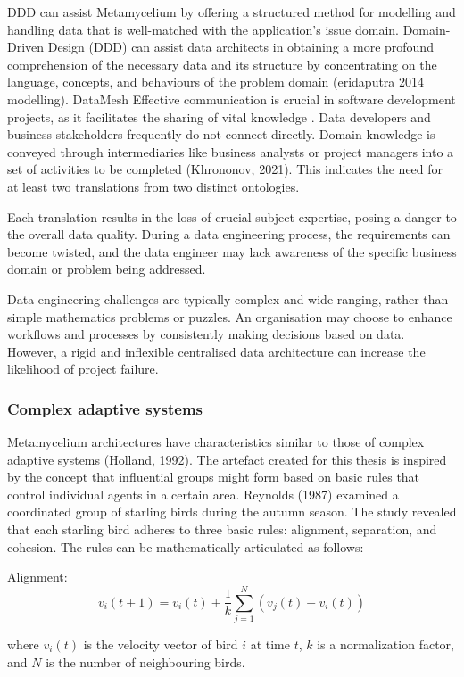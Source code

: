 \documentclass[journal]{IEEEtran}
\begin{document}
DDD can assist Metamycelium by offering a structured method for modelling and handling data that is well-matched with the application's issue domain. Domain-Driven Design (DDD) can assist data architects in obtaining a more profound comprehension of the necessary data and its structure by concentrating on the language, concepts, and behaviours of the problem domain (eridaputra 2014 modelling). DataMesh Effective communication is crucial in software development projects, as it facilitates the sharing of vital knowledge \cite{sudhakar2012model}. Data developers and business stakeholders frequently do not connect directly. Domain knowledge is conveyed through intermediaries like business analysts or project managers into a set of activities to be completed (Khrononov, 2021). This indicates the need for at least two translations from two distinct ontologies.

Each translation results in the loss of crucial subject expertise, posing a danger to the overall data quality. During a data engineering process, the requirements can become twisted, and the data engineer may lack awareness of the specific business domain or problem being addressed.

Data engineering challenges are typically complex and wide-ranging, rather than simple mathematics problems or puzzles. An organisation may choose to enhance workflows and processes by consistently making decisions based on data. However, a rigid and inflexible centralised data architecture can increase the likelihood of project failure.


\subsubsection{Complex adaptive systems}

Metamycelium architectures have characteristics similar to those of complex adaptive systems (Holland, 1992). The artefact created for this thesis is inspired by the concept that influential groups might form based on basic rules that control individual agents in a certain area. Reynolds (1987) examined a coordinated group of starling birds during the autumn season. The study revealed that each starling bird adheres to three basic rules: alignment, separation, and cohesion. The rules can be mathematically articulated as follows:

Alignment:
$$
v_i(t+1) = v_i(t) + \frac{1}{k} \sum_{j=1}^{N} (v_j(t) - v_i(t))
$$

where $v_i(t)$ is the velocity vector of bird $i$ at time $t$, $k$ is a normalization factor, and $N$ is the number of neighbouring birds.
\end{document}
